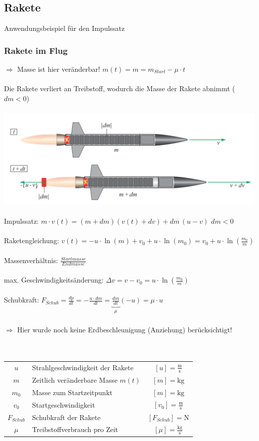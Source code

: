 	
	
	
	
	\subsection{Rakete}
	Anwendungsbeispiel für den Impulssatz
	
	\subsubsection{Rakete im Flug}
	$\Rightarrow$ Masse ist hier veränderbar! \qquad $m(t) = m = m_{Start} - \mu \cdot t$ \\
	\\
	Die Rakete verliert an Treibstoff, wodurch die Masse der Rakete abnimmt ($dm < 0$)\\
	\\	
	\includegraphics[width=0.73\linewidth]{Bilder/rakete} \\
	\\


	Impulssatz: \quad $ m \cdot v(t) = (m + dm)(v(t) + dv) + dm \,(u-v) $ \qquad $dm < 0$ \\
	\\
	Raketengleichung: $v(t) = - u \cdot \ln(m) + v_0 + u \cdot \ln(m_0) = v_0 + u \cdot \ln(\frac{m_0}{m})$ \\
	\\
	Massenverhältnis: $\frac{Startmasse}{Endmasse}$ \\
	\\
	max. Geschwindigkeitsänderung: $\Delta v = v - v_0 = u \cdot \ln(\frac{m_0}{m})$ \\
	\\
	Schubkraft: $F_{Schub} = \frac{dp}{dt} = - \frac{u \cdot dm}{dt} =  \underbrace{ \frac{dm}{dt} }_{\substack{\mu}} (-u) = \mu \cdot u$ \\ 
	\\
	$\Rightarrow$ Hier wurde noch keine Erdbeschleunigung (Anziehung) berücksichtigt! \\
	\\
	\\
	\begin{tabular}{c l c}
	$u$ &  Strahlgeschwindigkeit der Rakete & $[u] =  \mathrm{\frac{m}{s}}$ \\	
	$m$ & Zeitlich veränderbare Masse $m(t)$ & $[m] = \mathrm{kg}$ \\
	$m_0$ & Masse zum Startzeitpunkt & $[m] = \mathrm{kg}$ \\
	$v_0$ & Startgeschwindigkeit & $[v_0] = \mathrm{\frac{m}{s}}$ \\
	$F_{Schub}$ & Schubkraft der Rakete & $[F_{Schub}] = \mathrm{N}$ \\
	$\mu$ & Treibstoffverbrauch pro Zeit & $[\mu] = \mathrm{\frac{kg}{s}}$
	\end{tabular}
	
